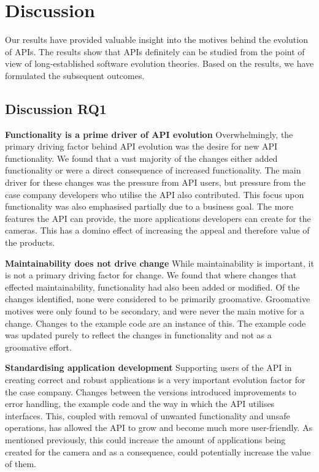 \documentclass{sig-alternate}
\begin{document}
\section{Discussion} \label{discussion}%
Our results have provided valuable insight into the motives behind the evolution of APIs. The results show that APIs definitely can be studied from the point of view of long-established software evolution theories. Based on the results, we have formulated the subsequent outcomes. 

\subsection{Discussion RQ1}  %

\noindent
\textbf{Functionality is a prime driver of API evolution  }  %
Overwhelmingly, the primary driving factor behind API evolution was the desire for new API functionality. We found that a vast majority of the changes either added functionality or were a direct consequence of increased functionality. The main driver for these changes was the pressure from API users, but pressure from the case company developers who utilise the API also contributed. This focus upon functionality was also emphasised partially due to a business goal. The more features the API can provide, the more applications developers can create for the cameras. This has a domino effect of increasing the appeal and therefore value of the products.

\smallskip \noindent 
\textbf{Maintainability does not drive change  }  %
While maintainability is important, it is not a primary driving factor for change. We found that where changes that effected maintainability, functionality had also been added or modified. Of the changes identified, none were considered to be primarily groomative. Groomative motives were only found to be secondary, and were never the main motive for a change. Changes to the example code are an instance of this. The example code was updated purely to reflect the changes in functionality and not as a groomative effort. 

\smallskip \noindent
\textbf{Standardising application development  } %
Supporting users of the API in creating correct and robust applications is a very important evolution factor for the case company. Changes between the versions introduced improvements to error handling, the example code and the way in which the API utilises interfaces. This, coupled with removal of unwanted functionality and unsafe operations, has allowed the API to grow and become much more user-friendly. As mentioned previously, this could increase the amount of applications being created for the camera and as a consequence, could potentially increase the value of them.
\end{document}

